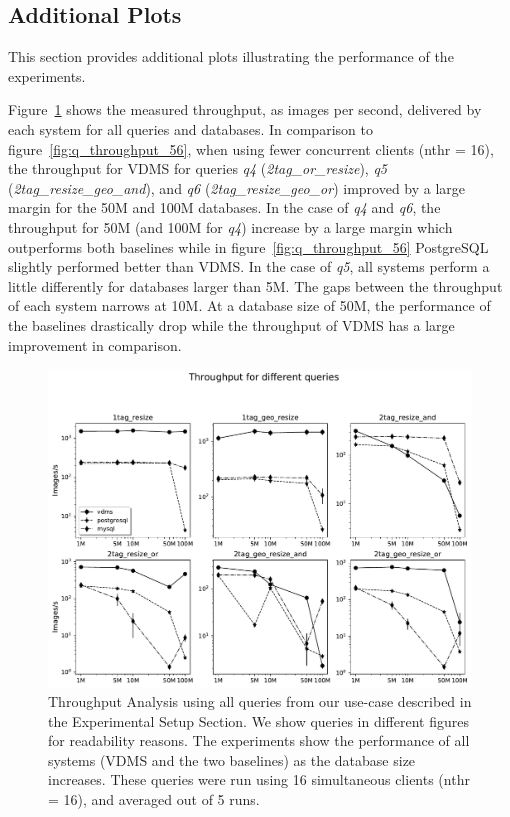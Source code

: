 \subsection{Additional Plots}
This section provides additional plots illustrating the performance of the experiments.

Figure~\ref{fig:q_throughput_16} shows the measured throughput,
as images per second, delivered by each system for all queries and databases.
In comparison to figure~\ref{fig:q_throughput_56}, when using fewer concurrent 
clients (nthr = 16), the throughput for VDMS for queries \textit{q4} (\textit{2tag\_or\_resize}), 
\textit{q5} (\textit{2tag\_resize\_geo\_and}), and
\textit{q6} (\textit{2tag\_resize\_geo\_or}) improved by a large margin 
for the 50M and 100M databases. 
In the case of \textit{q4} and \textit{q6}, the throughput for 50M (and 100M for \textit{q4})
increase by a large margin which outperforms both baselines while in figure~\ref{fig:q_throughput_56}
PostgreSQL slightly performed better than VDMS. 
In the case of \textit{q5}, all systems perform a little differently for databases
larger than 5M.  The gaps between the throughput of each system narrows at 10M.  
At a database size of 50M, the performance of the baselines drastically drop
while the throughput of VDMS has a large improvement in comparison.

\begin{figure}[ht]
\includegraphics[width=\columnwidth]{figures/plot_th_16_mosaic_results_throughput}
\caption{Throughput Analysis using all queries from our use-case
described in the Experimental Setup Section.
We show queries in different figures for readability reasons.
The experiments show the performance of all systems (VDMS and the two baselines) as the
database size increases.
These queries were run using 16 simultaneous clients (nthr = 16),
and averaged out of 5 runs.}
\label{fig:q_throughput_16}
\end{figure}

